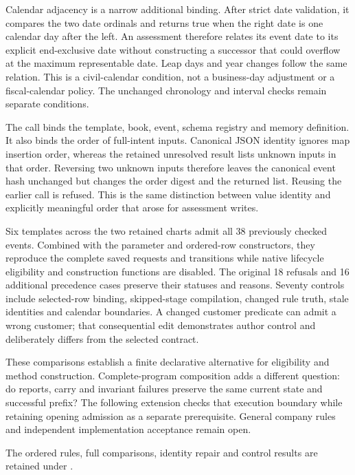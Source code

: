 Calendar adjacency is a narrow additional binding. After strict date
validation, it compares the two date ordinals and returns true when the right
date is one calendar day after the left. An assessment therefore relates its
event date to its explicit end-exclusive date without constructing a successor
that could overflow at the maximum representable date. Leap days and year
changes follow the same relation. This is a civil-calendar condition, not a
business-day adjustment or a fiscal-calendar policy. The unchanged chronology
and interval checks remain separate conditions.

The call binds the template, book, event, schema registry and memory definition.
It also binds the order of full-intent inputs. Canonical JSON identity ignores
map insertion order, whereas the retained unresolved result lists unknown
inputs in that order. Reversing two unknown inputs therefore leaves the
canonical event hash unchanged but changes the order digest and the returned
list. Reusing the earlier call is refused. This is the same distinction between
value identity and explicitly meaningful order that arose for assessment writes.

Six templates across the two retained charts admit all 38 previously checked
events. Combined with the parameter and ordered-row constructors, they reproduce
the complete saved requests and transitions while native lifecycle eligibility
and construction functions are disabled. The original 18 refusals and 16
additional precedence cases preserve their statuses and reasons. Seventy
controls include selected-row binding, skipped-stage compilation, changed rule
truth, stale identities and calendar boundaries. A changed customer predicate
can admit a wrong customer; that consequential edit demonstrates author control
and deliberately differs from the selected contract.

These comparisons establish a finite declarative alternative for eligibility
and method construction. Complete-program composition adds a different question:
do reports, carry and invariant failures preserve the same current state and
successful prefix? The following extension checks that execution boundary
while retaining opening admission as a separate prerequisite. General company
rules and independent implementation acceptance remain open.

\begingroup\raggedright
The ordered rules, full comparisons, identity repair and control results are
retained under
.
\par
\endgroup
